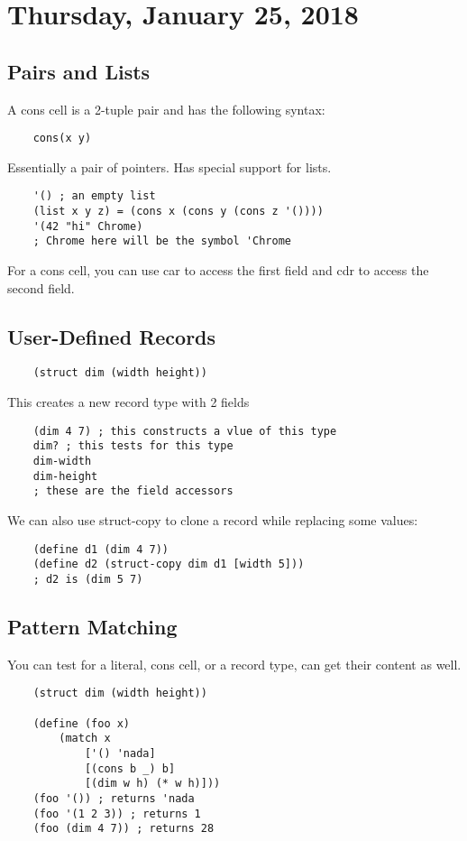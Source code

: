\documentclass[12pt]{article}
\begin{document}
\section{Thursday, January 25, 2018}

\subsection{Pairs and Lists}

A cons cell is a 2-tuple pair and has the following syntax:
\begin{lstlisting}
	cons(x y)
\end{lstlisting}
Essentially a pair of pointers. Has special support for lists.
\begin{lstlisting}
	'() ; an empty list
	(list x y z) = (cons x (cons y (cons z '())))
	'(42 "hi" Chrome)
	; Chrome here will be the symbol 'Chrome
\end{lstlisting}

For a cons cell, you can use car to access the first field and cdr to access the second field.

\subsection{User-Defined Records}

\begin{lstlisting}
	(struct dim (width height))
\end{lstlisting}
This creates a new record type with 2 fields
\begin{lstlisting}
	(dim 4 7) ; this constructs a vlue of this type
	dim? ; this tests for this type
	dim-width
	dim-height
	; these are the field accessors
\end{lstlisting}

We can also use struct-copy to clone a record while replacing some values:
\begin{lstlisting}
	(define d1 (dim 4 7))
	(define d2 (struct-copy dim d1 [width 5]))
	; d2 is (dim 5 7)
\end{lstlisting}

\subsection{Pattern Matching}

You can test for a literal, cons cell, or a record type, can get their content as well.

\begin{lstlisting}
	(struct dim (width height))
	
	(define (foo x)
		(match x
			['() 'nada]
			[(cons b _) b]
			[(dim w h) (* w h)]))
	(foo '()) ; returns 'nada
	(foo '(1 2 3)) ; returns 1
	(foo (dim 4 7)) ; returns 28
\end{lstlisting}
\end{document}
